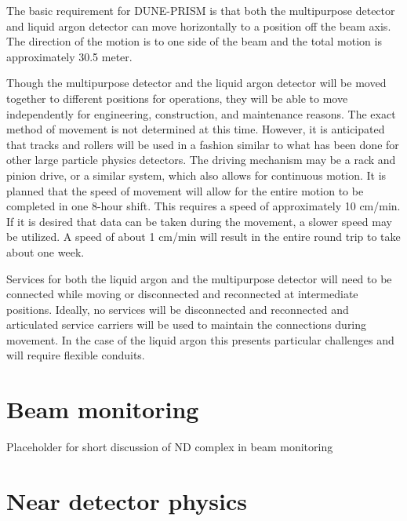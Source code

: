 The basic requirement for DUNE-PRISM is that both the multipurpose detector and liquid argon detector can move horizontally to a position off the beam axis. The direction of the motion is to one side of the beam and the total motion is approximately 30.5 meter. 

Though the multipurpose detector and the liquid argon detector will be moved together to different positions for operations, they will be able to move independently for engineering, construction, and maintenance reasons.  The exact method of movement is not determined at this time. However, it is anticipated that tracks and rollers will be used in a fashion similar to what has been done for other large particle physics detectors. The driving mechanism may be a rack and pinion drive, or a similar system, which also allows for continuous motion. 
It is planned that the speed of movement will allow for the entire motion to be completed in one 8-hour shift. This requires a speed of approximately 10 cm/min. If it is desired that data can be taken during the movement, a slower speed may be utilized. A speed of about 1 cm/min will result in the entire round trip to take about one week. 

Services for both the liquid argon and the multipurpose detector will need to be connected while moving or disconnected and reconnected at intermediate positions. Ideally, no services will be disconnected and reconnected and articulated service carriers will be used to maintain the connections during movement. In the case of the liquid argon this presents particular challenges and will require flexible conduits. 




\section{Beam monitoring}
\label{sec:exsum-nd-role-bm}

Placeholder for short discussion of ND complex in beam monitoring

\section{Near detector physics}
\label{sec:exsum-nd-role-ndphysics}

